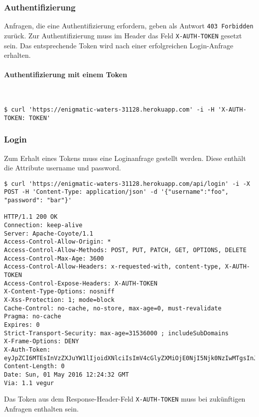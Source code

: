 \subsubsection{Authentifizierung}
Anfragen, die eine Authentifizierung erfordern, geben als Antwort \colorbox{pregray}{\lstinline{403 Forbidden}} zurück. Zur Authentifizierung muss im Header das Feld \colorbox{pregray}{\lstinline{X-AUTH-TOKEN}} gesetzt sein. Das entsprechende Token wird nach einer erfolgreichen Login-Anfrage erhalten.

\paragraph{Authentifizierung mit einem Token}\mbox{}\\
\begin{lstlisting}
$ curl 'https://enigmatic-waters-31128.herokuapp.com' -i -H 'X-AUTH-TOKEN: TOKEN'
\end{lstlisting}

\subsubsection{Login}
Zum Erhalt eines Tokens muss eine Loginanfrage gestellt werden. Diese enthält die Attribute username und password.
\vspace{2em}
\begin{lstlisting}
$ curl 'https://enigmatic-waters-31128.herokuapp.com/api/login' -i -X POST -H 'Content-Type: application/json' -d '{"username":"foo", "password": "bar"}'

HTTP/1.1 200 OK
Connection: keep-alive
Server: Apache-Coyote/1.1
Access-Control-Allow-Origin: *
Access-Control-Allow-Methods: POST, PUT, PATCH, GET, OPTIONS, DELETE
Access-Control-Max-Age: 3600
Access-Control-Allow-Headers: x-requested-with, content-type, X-AUTH-TOKEN
Access-Control-Expose-Headers: X-AUTH-TOKEN
X-Content-Type-Options: nosniff
X-Xss-Protection: 1; mode=block
Cache-Control: no-cache, no-store, max-age=0, must-revalidate
Pragma: no-cache
Expires: 0
Strict-Transport-Security: max-age=31536000 ; includeSubDomains
X-Frame-Options: DENY
X-Auth-Token: eyJpZCI6MTEsInVzZXJuYW1lIjoidXNlciIsImV4cGlyZXMiOjE0NjI5Njk0NzIwMTgsInJvbGVzIjpbIlVTRVIiXX0=.LDd74G0yJAuQChYR9P0AOmThfylOGGlY19u2DcTcXyQ=
Content-Length: 0
Date: Sun, 01 May 2016 12:24:32 GMT
Via: 1.1 vegur
\end{lstlisting}
\vspace{2em}
Das Token aus dem Response-Header-Feld \colorbox{pregray}{\lstinline{X-AUTH-TOKEN}} muss bei zukünftigen Anfragen enthalten sein.

